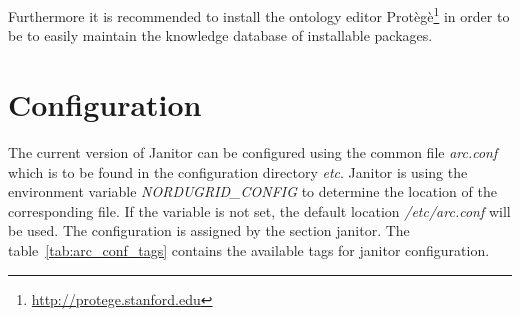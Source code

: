 Furthermore it is recommended to install the ontology editor 
Prot\`eg\`e\footnote{\href{http://protege.stanford.edu}{http://protege.stanford.edu}} in order to be to easily maintain the 
knowledge database of installable packages.







\section{Configuration}\label{sec:janitor_configuration}

The current version of Janitor can be configured using the common file \textit{arc.conf} which is to be found in the 
configuration directory \textit{etc}. Janitor is using the environment variable \textit{NORDUGRID\_CONFIG} to determine the location 
of the corresponding file. If the variable is not set, the default location \textit{/etc/arc.conf} will be used. 
The configuration is assigned by the section \lbrack janitor\rbrack. The table~\ref{tab:arc_conf_tags} contains the available tags
for janitor configuration.
